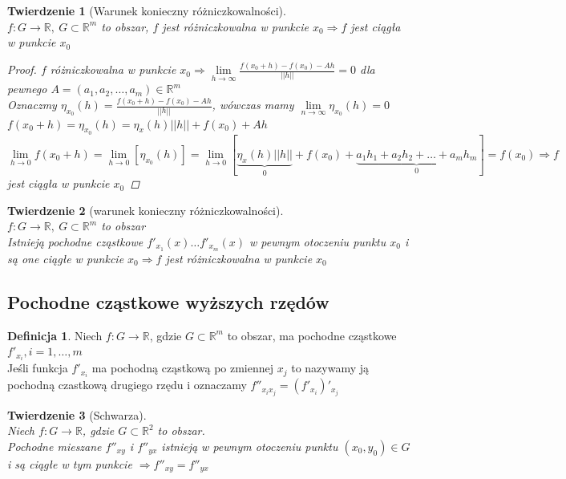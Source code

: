 \documentclass[12pt,a4paper]{article}
\newtheorem{tw}{Twierdzenie}
\theoremstyle{definition}
\newtheorem{df}{Definicja}
\begin{document}

\begin{tw}[Warunek konieczny różniczkowalności]~\\
$f:G\to\mathbb{R}, ~ G\subset\mathbb{R}^m$ to obszar, $f$ jest różniczkowalna w punkcie $x_0 \Rightarrow f$ jest ciągła w punkcie $x_0$
\begin{proof}
$f$ różniczkowalna w punkcie $x_0 \Rightarrow \lim\limits_{h\to\infty}\frac{f(x_0+h)-f(x_0)-Ah}{||h||}=0$ dla pewnego $A=(a_1,a_2, \dots, a_m) \in \mathbb{R}^m$\\
Oznaczmy $\eta_{x_0}(h) = \frac{f(x_0+h)-f(x_0)-Ah}{||h||}$, wówczas mamy $\lim\limits_{n\to\infty}\eta_{x_0}(h) = 0$\\
$f(x_0+h)=\eta_{x_0}(h) = \eta_x(h)||h|| + f(x_0) + Ah$\\
$\lim\limits_{h\to 0}f(x_0+h) = \lim\limits_{h\to 0}[\eta_{x_0}(h)] = \lim\limits_{h\to 0}[\underbrace{\eta_x(h)||h||}_{0} + f(x_0) + \underbrace{a_1h_1 + a_2h_2 + \dots + a_mh_m}_{0}] = f(x_0) \Rightarrow f$ jest ciągła w punkcie $x_0$
\end{proof}
\end{tw}

\begin{tw}[warunek konieczny różniczkowalności]~\\
$f: G\to\mathbb{R}, ~ G\subset \mathbb{R}^m$ to obszar\\
Istnieją pochodne cząstkowe $f'_{x_1}(x)\dots f'_{x_m}(x)$ w pewnym otoczeniu punktu $x_0$ i są one ciągłe w punkcie $x_0 \Rightarrow f$ jest różniczkowalna w punkcie $x_0$
\end{tw}

\subsection{Pochodne cząstkowe wyższych rzędów}
\begin{df}
Niech $f: G\to\mathbb{R}$, gdzie $G\subset \mathbb{R}^m$ to obszar, ma pochodne cząstkowe $f'_{x_i}, i=1,\dots , m$\\
Jeśli funkcja $f'_{x_i}$ ma pochodną cząstkową po zmiennej $x_j$ to nazywamy ją pochodną czastkową drugiego rzędu i oznaczamy $f''_{x_ix_j} = (f'_{x_i})'_{x_j}$
\end{df}

\begin{tw}[Schwarza]~\\
Niech $f: G\to\mathbb{R}$, gdzie $G\subset \mathbb{R}^2$ to obszar.\\
Pochodne mieszane $f''_{xy}$ i $f''_{yx}$ istnieją w pewnym otoczeniu punktu $(x_0, y_0)\in G$ i są ciągłe w tym punkcie $\Rightarrow f''_{xy} = f''_{yx}$
\end{tw}
\end{document}
